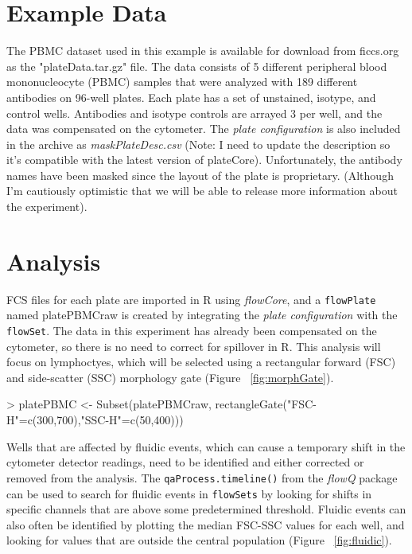 \documentclass[12pt]{article}
\newcommand{\Rfunction}[1]{{\texttt{#1()}}}
\newcommand{\Rclass}[1]{{\texttt{#1}}}
\newcommand{\Robject}[1]{{\texttt{#1}}}
\newcommand{\Rpackage}[1]{{\textit{#1}}}
\begin{document}
\section{Example Data}
The PBMC dataset used in this example is available for download from ficcs.org as the "plateData.tar.gz" file. The data consists
of 5 different peripheral blood mononucleocyte (PBMC) samples that were analyzed with 189 different antibodies on 96-well plates. Each plate has a set of
unstained, isotype, and control wells. Antibodies and isotype controls are arrayed 3 per well, and the data was compensated
on the cytometer. The \textit{plate configuration} is also included in the archive as \textit{maskPlateDesc.csv} (Note: I need
to update the description so it's compatible with the latest version of plateCore).
Unfortunately, the antibody names have been masked since the layout of the plate is proprietary. (Although
I'm cautiously optimistic that we will be able to release more information about the experiment).

\section{Analysis}
FCS files for each plate are imported in R using \Rpackage{flowCore}, and a \Robject{flowPlate} named platePBMCraw is created by integrating
the \textit{plate configuration} with the \Robject{flowSet}. The data in this experiment has already been compensated on
the cytometer, so there is no need to correct for spillover in R. This analysis will focus on lymphoctyes, which
will be selected using a rectangular forward (FSC) and side-scatter (SSC) morphology gate (Figure ~\ref{fig:morphGate}).

\begin{Schunk}
\begin{Sinput}
> platePBMC <- Subset(platePBMCraw, rectangleGate("FSC-H"=c(300,700),"SSC-H"=c(50,400)))	
\end{Sinput}
\end{Schunk}

Wells that are affected by fluidic events, which can cause a temporary shift in the cytometer detector readings, need
to be identified and either corrected or removed from the analysis. The \Rfunction{qaProcess.timeline} from
the \Rpackage{flowQ} package can be used to search for fluidic events in \Rclass{flowSets} by looking for shifts in specific channels that
are above some predetermined threshold. Fluidic events can also often be identified by plotting the median FSC-SSC
values for each well, and looking for values that are outside the central population (Figure ~\ref{fig:fluidic}).
\end{document}
